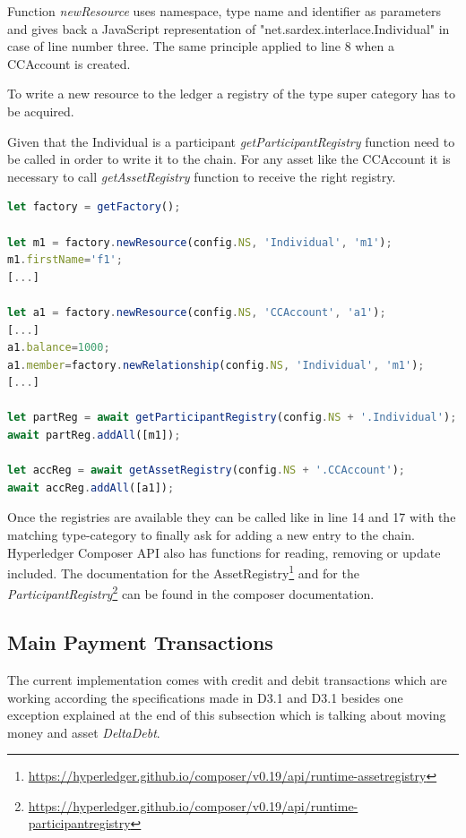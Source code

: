 Function \textit{newResource} uses namespace, type name and identifier as parameters and gives back a JavaScript representation of "net.sardex.interlace.Individual" in case of line number three. The same principle applied to line 8 when a CCAccount is created.

To write a new resource to the ledger a registry of the type super category has to be acquired.

Given that the Individual is a participant \textit{getParticipantRegistry} function need to be called in order to write it to the chain. For any asset like the CCAccount it is necessary to call \textit{getAssetRegistry} function to receive the right registry.

\begin{center}
\begin{minipage}{0.8\textwidth}
\small
\begin{lstlisting}[language=javascript,firstnumber=1,caption={\bf\small chaincode adding a new resource in \textit{initBlockchain} function}, captionpos=b,label=lst:initBlock]
let factory = getFactory();

let m1 = factory.newResource(config.NS, 'Individual', 'm1');
m1.firstName='f1';
[...]

let a1 = factory.newResource(config.NS, 'CCAccount', 'a1');
[...]
a1.balance=1000;
a1.member=factory.newRelationship(config.NS, 'Individual', 'm1');
[...]

let partReg = await getParticipantRegistry(config.NS + '.Individual');
await partReg.addAll([m1]);

let accReg = await getAssetRegistry(config.NS + '.CCAccount');
await accReg.addAll([a1]);
\end{lstlisting}
\end{minipage}
\end{center}

Once the registries are available they can be called like in line 14 and 17 with the matching type-category to finally ask for adding a new entry to the chain. Hyperledger Composer API also has  functions for reading, removing or update included. The documentation for the AssetRegistry\footnote{\url{https://hyperledger.github.io/composer/v0.19/api/runtime-assetregistry}} and for the \textit{ParticipantRegistry}\footnote{\url{https://hyperledger.github.io/composer/v0.19/api/runtime-participantregistry}} can be found in the composer documentation.

\subsection{Main Payment Transactions}
\label{subsec:main-payment-transactions}
The current implementation comes with credit and debit transactions which are working according the specifications made in D3.1 and D3.1 besides one exception explained at the end of this subsection which is talking about moving money and asset \textit{DeltaDebt}.


